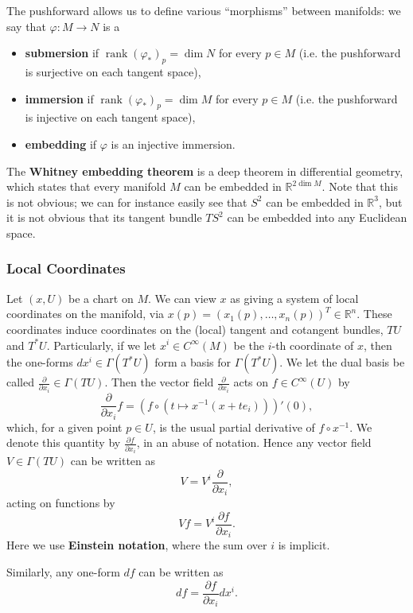 \documentclass[reqno]{amsart}
\numberwithin{equation}{section}
\begin{document}
The pushforward allows us to define various ``morphisms'' between manifolds: we say that $\varphi: M \to N$ is a
\begin{itemize}
    \item \textbf{submersion} if $\operatorname{rank}(\varphi_*)_p = \dim N$ for every $p \in M$
    (i.e. the pushforward is surjective on each tangent space),
    \item \textbf{immersion} if $\operatorname{rank}(\varphi_*)_p = \dim M$ for every $p \in M$
    (i.e. the pushforward is injective on each tangent space),
    \item \textbf{embedding} if $\varphi$ is an injective immersion.
\end{itemize}
The \textbf{Whitney embedding theorem} is a deep theorem in differential geometry, which
states that every manifold $M$ can be embedded in $\mathbb R^{2 \dim M}$. Note that this is not obvious;
we can for instance easily see that $S^2$ can be embedded in $\mathbb R^3$, but it is not obvious that its
tangent bundle $TS^2$ can be embedded into any Euclidean space.

\subsubsection{Local Coordinates}

Let $(x, U)$ be a chart on $M$. We can view $x$ as giving a system of local coordinates on the manifold, via
$x(p) = (x_1(p), \ldots, x_n(p))^T \in \mathbb R^n$.
These coordinates induce
coordinates on the (local) tangent and cotangent bundles, $TU$ and $T^*U$. Particularly, if we let
$x^i \in C^{\infty}(M)$ be the $i$-th coordinate of $x$, then the one-forms $dx^i \in \Gamma(T^*U)$ form a basis for
$\Gamma(T^*U)$. We let the dual basis be called $\frac{\partial}{\partial x_i} \in \Gamma(TU)$. Then the vector
field $\frac{\partial}{\partial x_i}$ acts on $f \in C^{\infty}(U)$ by
$$
    \frac{\partial}{\partial x_i} f = (f \circ (t \mapsto x^{-1}(x  + t e_i)))'(0),
$$
which, for a given point $p \in U$, is the usual partial derivative of $f \circ x^{-1}$. We denote this quantity by
$\frac{\partial f}{\partial x_i}$, in an abuse of notation. Hence any vector field $V \in \Gamma(TU)$ can be written
as
$$
    V = V^i \frac{\partial}{\partial x_i},
$$
acting on functions by
$$
    Vf = V^i \frac{\partial f}{\partial x_i}.
$$
Here we use \textbf{Einstein notation}, where the sum over $i$ is implicit.

Similarly, any one-form $df$ can be written as
$$
    df = \frac{\partial f}{\partial x_i} dx^i.
$$
\end{document}
